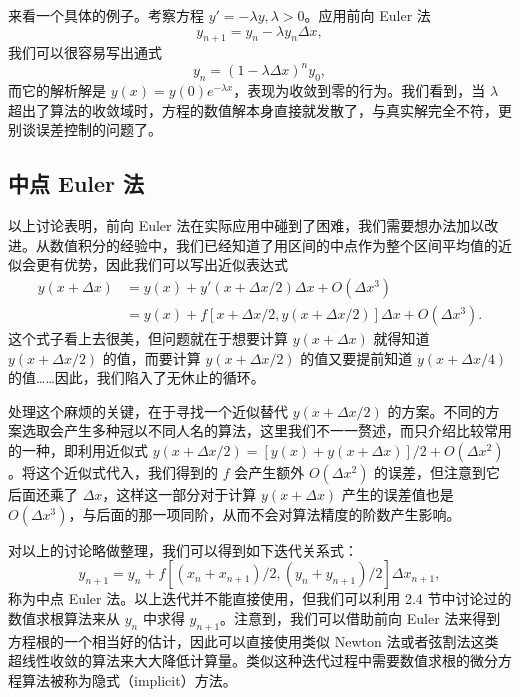 来看一个具体的例子。考察方程 $y'=-\lambda y,\lambda>0$。应用前向 Euler 法
\begin{equation}
y_{n+1}=y_n-\lambda y_n\Delta x,
\tag{2.6.7}
\end{equation}
我们可以很容易写出通式
\begin{equation}
y_n=(1-\lambda\Delta x)^n y_0,
\tag{2.6.8}
\end{equation}
而它的解析解是 $y(x)=y(0)e^{-\lambda x}$，表现为收敛到零的行为。我们看到，当 $\lambda$ 超出了算法的收敛域时，方程的数值解本身直接就发散了，与真实解完全不符，更别谈误差控制的问题了。

\subsection{中点 Euler 法}

以上讨论表明，前向 Euler 法在实际应用中碰到了困难，我们需要想办法加以改进。从数值积分的经验中，我们已经知道了用区间的中点作为整个区间平均值的近似会更有优势，因此我们可以写出近似表达式
\begin{equation}
\begin{aligned}
y(x+\Delta x)
&=y(x)+y'(x+\Delta x/2)\Delta x+O(\Delta x^3)\\
&=y(x)+f[x+\Delta x/2,y(x+\Delta x/2)]\Delta x+O(\Delta x^3).
\end{aligned}
\tag{2.6.9}
\end{equation}
这个式子看上去很美，但问题就在于想要计算 $y(x+\Delta x)$ 就得知道 $y(x+\Delta x/2)$ 的值，而要计算 $y(x+\Delta x/2)$ 的值又要提前知道 $y(x+\Delta x/4)$ 的值……因此，我们陷入了无休止的循环。

处理这个麻烦的关键，在于寻找一个近似替代 $y(x+\Delta x/2)$ 的方案。不同的方案选取会产生多种冠以不同人名的算法，这里我们不一一赘述，而只介绍比较常用的一种，即利用近似式 $y(x+\Delta x/2)=[y(x)+y(x+\Delta x)]/2+O(\Delta x^2)$。将这个近似式代入，我们得到的 $f$ 会产生额外 $O(\Delta x^2)$ 的误差，但注意到它后面还乘了 $\Delta x$，这样这一部分对于计算 $y(x+\Delta x)$ 产生的误差值也是 $O(\Delta x^3)$，与后面的那一项同阶，从而不会对算法精度的阶数产生影响。

对以上的讨论略做整理，我们可以得到如下迭代关系式：
\begin{equation}
y_{n+1}=y_n+f\!\left[(x_n+x_{n+1})/2,(y_n+y_{n+1})/2\right]\Delta x_{n+1},
\tag{2.6.10}
\end{equation}
称为中点 Euler 法。以上迭代并不能直接使用，但我们可以利用 2.4 节中讨论过的数值求根算法来从 $y_n$ 中求得 $y_{n+1}$。注意到，我们可以借助前向 Euler 法来得到方程根的一个相当好的估计，因此可以直接使用类似 Newton 法或者弦割法这类超线性收敛的算法来大大降低计算量。类似这种迭代过程中需要数值求根的微分方程算法被称为隐式（implicit）方法。

